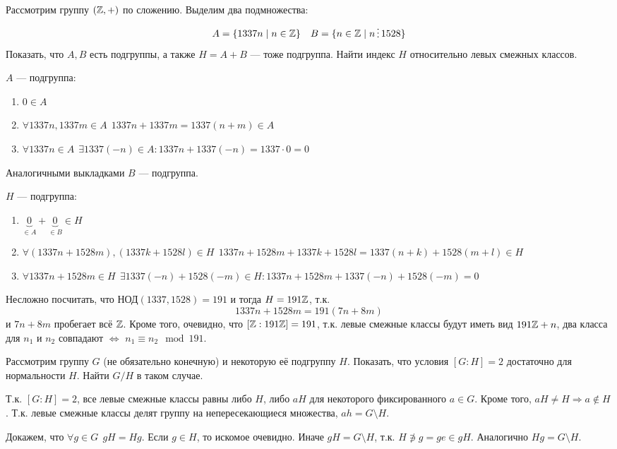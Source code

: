 \begin{exercise}
    Рассмотрим группу \((\mathbb{Z}, +)\) по сложению. Выделим два подмножества:
    \[A = \{1337n \mid n \in \Z\} \quad B = \{n \in \Z \mid n \divided 1528\}\]
    Показать, что \(A, B\) есть подгруппы, а также \(H = A + B\) --- тоже подгруппа. Найти индекс \(H\) относительно левых смежных классов.
\end{exercise}
\begin{solution}
    \(A\) --- подгруппа:
    \begin{enumerate}
        \item \(0 \in A\)
        \item \(\forall 1337n, 1337m \in A \ \ 1337n + 1337m = 1337(n + m) \in A\)
        \item \(\forall 1337n \in A \ \ \exists 1337( - n) \in A : 1337n + 1337( - n) = 1337 \cdot 0 = 0\)
    \end{enumerate}

    Аналогичными выкладками \(B\) --- подгруппа.

    \(H\) --- подгруппа:
    \begin{enumerate}
        \item \(\underbrace{0}_{\in A} + \underbrace{0}_{\in B} \in H\)
        \item \(\forall (1337n + 1528m), (1337k + 1528l) \in H \ \ 1337n + 1528m + 1337k + 1528l = 1337(n + k) + 1528(m + l) \in H\)
        \item \(\forall 1337n + 1528m \in H \ \ \exists 1337( -n) + 1528( -m) \in H : 1337n + 1528m + 1337( - n) + 1528( - m) = 0\)
    \end{enumerate}

    Несложно посчитать, что НОД\((1337, 1528) = 191\) и тогда \(H = 191\mathbb{Z}\), т.к.
    \[1337n + 1528m = 191(7n + 8m)\]
    и \(7n + 8m\) пробегает всё \(\mathbb{Z}\).
    Кроме того, очевидно, что \([\mathbb{Z} : 191\mathbb{Z}] = 191\), т.к. левые смежные классы будут иметь вид \(191\mathbb{Z} + n\), два класса для \(n_1\) и \(n_2\) совпадают \(\Leftrightarrow \) \(n_1 \equiv n_2 \mod 191\).
\end{solution}

\begin{exercise}
    Рассмотрим группу \(G\) (не обязательно конечную) и некоторую её подгруппу \(H\). Показать, что условия \([G : H] = 2\) достаточно для нормальности \(H\). Найти \(G / H\) в таком случае.
\end{exercise}
\begin{solution}
    Т.к. \([G : H] = 2\), все левые смежные классы равны либо \(H\), либо \(aH\) для некоторого фиксированного \(a \in G\). Кроме того, \(aH \neq H \Rightarrow a \notin H\). Т.к. левые смежные классы делят группу на непересекающиеся множества, \(ah = G \setminus H\).

    Докажем, что \(\forall g \in G \ \ gH = Hg\). Если \(g \in H\), то искомое очевидно. Иначе \(gH = G \setminus H\), т.к. \(H \not\ni g = ge \in gH\). Аналогично \(Hg = G \setminus H\).
\end{solution}

